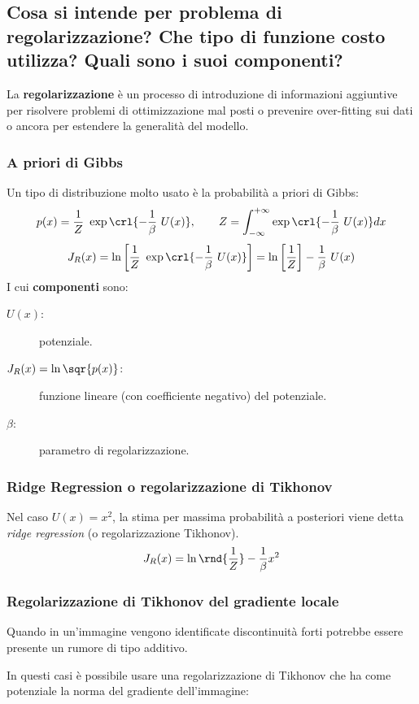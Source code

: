 \documentclass[\main/main.tex]{subfiles}
\begin{document}
\providecommand{\gauss}[3]{\frac{1}{\sqrt{2\pi #3}}\,\exp\crl{-\frac{\rnd{#1-#2}^2}{2 #3}}}

\subsection{Cosa si intende per problema di regolarizzazione? Che tipo di funzione costo utilizza? Quali sono i suoi componenti?}
La \textbf{regolarizzazione} è un processo di introduzione di informazioni aggiuntive per risolvere problemi di ottimizzazione mal posti o prevenire over-fitting sui dati o ancora per estendere la generalità del modello.

\subsubsection{A priori di Gibbs}

Un tipo di distribuzione molto usato è la probabilità a priori di Gibbs:
\[
	p(x)=\frac{1}{Z}\ \exp\crl{-\frac{1}{\beta}\ U(x)}, \qquad Z=\int_{-\infty}^{+\infty}\exp\crl{-\frac{1}{\beta}\ U(x)}dx
\]
\[
	J_R(x) = \ln\left[\frac{1}{Z}\ \exp\crl{-\frac{1}{\beta}\ U(x)}\right] = \ln\left[\frac{1}{Z}\right]-\frac{1}{\beta}\ U(x)
\]
I cui \textbf{componenti} sono:
\begin{description}
	\item[$U(x)$:] potenziale.
	\item[$J_R(x) = \ln\sqr{p(x)}$:] funzione lineare (con coefficiente negativo) del potenziale.
	\item[$\beta$:] parametro di regolarizzazione.
\end{description}


\subsubsection{Ridge Regression o regolarizzazione di Tikhonov}
Nel caso $U(x)=x^2$, la stima per massima probabilità a posteriori viene detta \textit{ridge regression} (o regolarizzazione Tikhonov).
\[
	J_R(x) = \ln\rnd{\frac{1}{Z}}-\frac{1}{\beta} x^2
\]

\subsubsection{Regolarizzazione di Tikhonov del gradiente locale}
Quando in un'immagine vengono identificate discontinuità forti potrebbe essere presente un rumore di tipo additivo.

In questi casi è possibile usare una regolarizzazione di Tikhonov che ha come potenziale la norma del gradiente dell'immagine:
\end{document}
